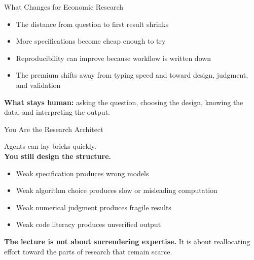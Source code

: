 \documentclass[10pt,english,aspectratio=169]{beamer}
\begin{document}
\begin{frame}{What Changes for Economic Research}
\begin{itemize}
    \item The distance from question to first result shrinks
    \item More specifications become cheap enough to try
    \item Reproducibility can improve because workflow is written down
    \item The premium shifts away from typing speed and toward design, judgment, and validation
\end{itemize}

\vspace{0.3cm}

\textbf{What stays human:} asking the question, choosing the design, knowing the data, and interpreting the output.
\end{frame}

\begin{frame}{You Are the Research Architect}
\begin{center}
\Large
Agents can lay bricks quickly.\\
\textbf{You still design the structure.}
\end{center}

\vspace{0.35cm}

\begin{itemize}
    \item Weak specification produces wrong models
    \item Weak algorithm choice produces slow or misleading computation
    \item Weak numerical judgment produces fragile results
    \item Weak code literacy produces unverified output
\end{itemize}

\vspace{0.25cm}

\textbf{The lecture is not about surrendering expertise.} It is about reallocating effort toward the parts of research that remain scarce.
\end{frame}
\end{document}
